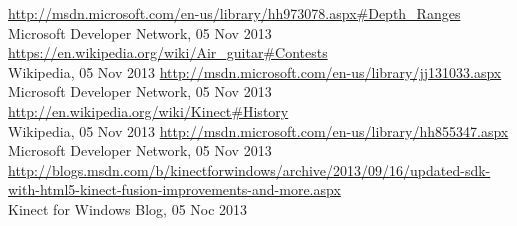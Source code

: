 \documentclass[a4paper,12pt]{article}
\begin{document}
\begin{thebibliography}{99}
\url{http://msdn.microsoft.com/en-us/library/hh973078.aspx#Depth_Ranges} \\
        Microsoft Developer Network, 05 Nov 2013
\url{https://en.wikipedia.org/wiki/Air_guitar#Contests} \\
        Wikipedia, 05 Nov 2013
\url{http://msdn.microsoft.com/en-us/library/jj131033.aspx} \\
        Microsoft Developer Network, 05 Nov 2013
\url{http://en.wikipedia.org/wiki/Kinect#History} \\
        Wikipedia, 05 Nov 2013
\url{http://msdn.microsoft.com/en-us/library/hh855347.aspx} \\
        Microsoft Developer Network, 05 Nov 2013
\url{http://blogs.msdn.com/b/kinectforwindows/archive/2013/09/16/updated-sdk-with-html5-kinect-fusion-improvements-and-more.aspx} \\
        Kinect for Windows Blog, 05 Noc 2013
\end{thebibliography}
\end{document}
